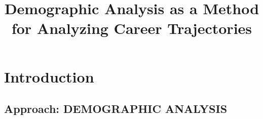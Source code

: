 \documentclass[12pt,a4paper]{article}
\title{Demographic Analysis as a Method for Analyzing Career Trajectories}
\author{}
\date{}
\begin{document}
\maketitle

\section{Introduction}\label{sec:introduction}


\newpage
\subsection{Approach: DEMOGRAPHIC ANALYSIS}\label{sec:demographicanalysis}

\end{document}
